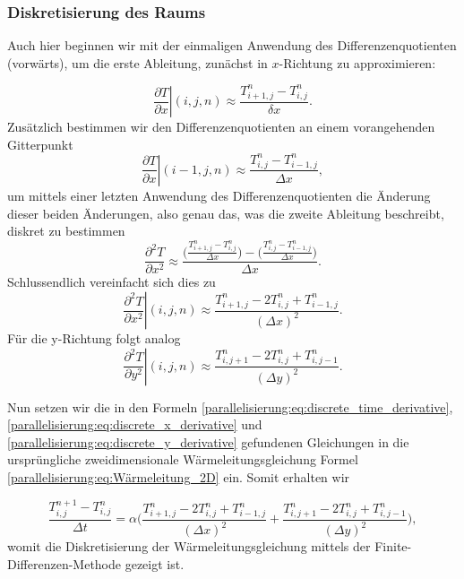 \subsubsection{Diskretisierung des Raums}
Auch hier beginnen wir mit der einmaligen Anwendung des Differenzenquotienten (vorwärts), um die erste Ableitung, zunächst in $x$-Richtung zu approximieren:

\begin{equation}
	\left. \frac{\partial T}{\partial x} \right|{(i,j,n)}
	\approx \frac{T_{i+1,j}^n - T_{i,j}^n}{\delta x}.
\end{equation}
Zusätzlich bestimmen wir den Differenzenquotienten an einem vorangehenden Gitterpunkt
\begin{equation}
	\left. \frac{\partial T}{\partial x} \right|{(i-1,j,n)}
	\approx \frac{T_{i,j}^n - T_{i-1,j}^n}{\Delta x},
\end{equation}
um mittels einer letzten Anwendung des Differenzenquotienten die Änderung dieser beiden Änderungen, also genau das, was die zweite Ableitung beschreibt, diskret zu bestimmen
\begin{equation}
	\frac{\partial^2 T}{\partial x^2} \approx
	\frac{ \biggl( \frac{T_{i+1,j}^n - T_{i,j}^n}{\Delta x} \biggr) - \biggl( \frac{T_{i,j}^n - T_{i-1,j}^n}{\Delta x} \biggr) }{\Delta x}.
\end{equation}
Schlussendlich vereinfacht sich dies zu 
\begin{equation}
	\label{parallelisierung:eq:discrete_x_derivative}
	\left. \frac{\partial^2 T}{\partial x^2} \right|{(i,j,n)} \approx \frac{T_{i+1,j}^n - 2T_{i,j}^n + T_{i-1,j}^n}{(\Delta x)^2}.
\end{equation}
Für die y-Richtung folgt analog
\begin{equation}
	\label{parallelisierung:eq:discrete_y_derivative}
	\left. \frac{\partial^2 T}{\partial y^2} \right|{(i,j,n)} \approx \frac{T_{i,j+1}^n - 2T_{i,j}^n + T_{i,j-1}^n}{(\Delta y)^2}.
\end{equation}


Nun setzen wir die in den Formeln \eqref{parallelisierung:eq:discrete_time_derivative},  \eqref{parallelisierung:eq:discrete_x_derivative} und \eqref{parallelisierung:eq:discrete_y_derivative} gefundenen Gleichungen in die ursprüngliche zweidimensionale Wärmeleitungsgleichung Formel \eqref{parallelisierung:eq:Wärmeleitung_2D} ein.
Somit erhalten wir 

\begin{equation}
	\label{parallelisierung:eq:update_formula_unsorted}
	\frac{T_{i,j}^{n+1} - T_{i,j}^n}{\Delta t}
	=
	\alpha \biggl(
	\frac{T_{i+1,j}^n - 2 T_{i,j}^n + T_{i-1,j}^n}{(\Delta x)^2}
	+
	\frac{T_{i,j+1}^n - 2 T_{i,j}^n + T_{i,j-1}^n}{(\Delta y)^2}
	\biggr),
\end{equation}
womit die Diskretisierung der Wärmeleitungsgleichung mittels der Finite-Differenzen-Methode gezeigt ist.


